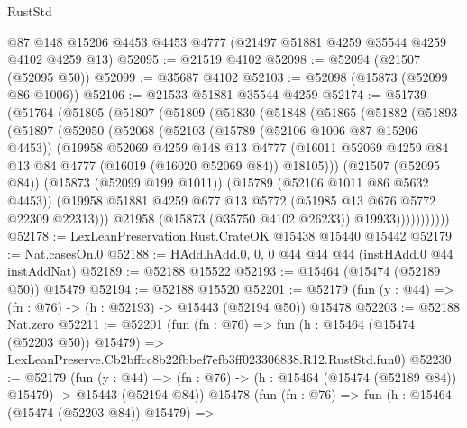 \begin{lexlean}{RustStd}
\begin{coremodule}
    @87
    @148
    @15206
    @4453
    @4453
    @4777
    (@21497 @51881 @4259 @35544 @4259 @4102 @4259 @13)
@52095 := @21519 @4102
@52098 := @52094 (@21507 (@52095 @50))
@52099 := @35687 @4102
@52103 := @52098 (@15873 (@52099 @86 @1006))
@52106 := @21533 @51881 @35544 @4259
@52174 := @51739
    (@51764
      (@51805
        (@51807
          (@51809
            (@51830
              (@51848
                (@51865
                  (@51882
                    (@51893
                      (@51897
                        (@52050
                          (@52068
                            (@52103
                              (@15789 (@52106 @1006 @87 @15206 @4453))
                              (@19958
                                @52069
                                @4259
                                @148
                                @13
                                @4777
                                (@16011
                                  @52069
                                  @4259
                                  @84
                                  @13
                                  @84
                                  @4777
                                  (@16019 (@16020 @52069 @84))
                                  @18105)))
                            (@21507 (@52095 @84))
                            (@15873 (@52099 @199 @1011))
                            (@15789 (@52106 @1011 @86 @5632 @4453))
                            (@19958
                              @51881
                              @4259
                              @677
                              @13
                              @5772
                              (@51985 @13 @676 @5772 @22309 @22313)))
                          @21958
                          (@15873 (@35750 @4102 @26233))
                          @19933)))))))))))
@52178 := LexLeanPreservation.Rust.CrateOK @15438 @15440 @15442
@52179 := Nat.casesOn.{0}
@52188 := HAdd.hAdd.{0, 0, 0} @44 @44 @44 (instHAdd.{0} @44 instAddNat)
@52189 := @52188 @15522
@52193 := @15464 (@15474 (@52189 @50)) @15479
@52194 := @52188 @15520
@52201 := @52179 (fun (y : @44) => (fn : @76) -> (h : @52193) -> @15443 (@52194 @50)) @15478
@52203 := @52188 Nat.zero
@52211 := @52201
    (fun (fn : @76) =>
    fun (h : @15464 (@15474 (@52203 @50)) @15479) =>
    LexLeanPreserve.Cb2bffcc8b22fbbef7efb3ff023306838.R12.RustStd.fun0)
@52230 := @52179
    (fun (y : @44) =>
    (fn : @76) -> (h : @15464 (@15474 (@52189 @84)) @15479) -> @15443 (@52194 @84))
    @15478
    (fun (fn : @76) =>
    fun (h : @15464 (@15474 (@52203 @84)) @15479) =>

\end{coremodule}
\end{lexlean}
